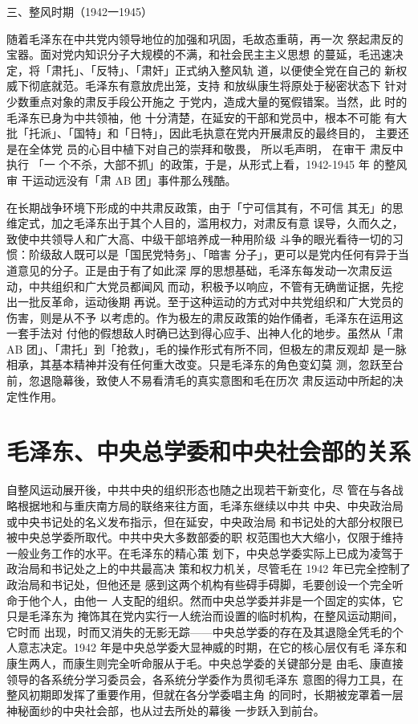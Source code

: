 三、整风时期（1942一1945）

随着毛泽东在中共党内领导地位的加强和巩固，毛故态重萌，再一次 祭起肃反的
宝器。面对党内知识分子大规模的不满，和社会民主主义思想 的蔓延，毛迅速决
定，将「肃托」、「反特」、「肃奸」正式纳入整风轨 道，以便使全党在自己的
新权威下彻底就范。毛泽东有意放虎出笼，支持 和放纵康生将原处于秘密状态下
针对少数重点对象的肃反手段公开施之 于党内，造成大量的冤假错案。当然，此
时的毛泽东已身为中共领袖，他 十分清楚，在延安的干部和党员中，根本不可能
有大批「托派」、「国特」和「日特」，因此毛执意在党内开展肃反的最终目的，
主要还是在全体党 员的心目中植下对自己的崇拜和敬畏， 所以毛声明， 在审干
肃反中执行 「一 个不杀，大部不抓」的政策，于是，从形式上看，1942-1945 年
的整风审 干运动远没有「肃 AB 团」事件那么残酷。

在长期战争环境下形成的中共肃反政策，由于「宁可信其有，不可信
其无」的思维定式，加之毛泽东出于其个人目的，滥用权力，对肃反有意
误导，久而久之，致使中共领导人和广大高、中级干部培养成一种用阶级
斗争的眼光看待一切的习惯：阶级敌人既可以是「国民党特务」、「暗害
分子」，更可以是党内任何有异于当道意见的分子。正是由于有了如此深
厚的思想基础，毛泽东每发动一次肃反运动，中共组织和广大党员都闻风
而动，积极予以响应，不管有无确凿证据，先挖出一批反革命，运动後期
再说。至于这种运动的方式对中共党组织和广大党员的伤害，则是从不予
以考虑的。作为极左的肃反政策的始作俑者，毛泽东在运用这一套手法对
付他的假想敌人时确已达到得心应手、出神人化的地步。虽然从「肃 AB
团」、「肃托」到「抢救」，毛的操作形式有所不同，但极左的肃反观却
是一脉相承，其基本精神并没有任何重大改变。只是毛泽东的角色变幻莫
测，忽跃至台前，忽退隐幕後，致使人不易看清毛的真实意图和毛在历次
肃反运动中所起的决定性作用。

\section{毛泽东、中央总学委和中央社会部的关系}
自整风运动展开後，中共中央的组织形态也随之出现若干新变化，尽
管在与各战略根据地和与重庆南方局的联络来往方面，毛泽东继续以中共
中央、中央政治局或中央书记处的名义发布指示，但在延安，中央政治局
和书记处的大部分权限已被中央总学委所取代。中共中央大多数部委的职
权范围也大大缩小，仅限于维持一般业务工作的水平。在毛泽东的精心策
划下，中央总学委实际上已成为凌驾于政治局和书记处之上的中共最高决
策和权力机关，尽管毛在 1942 年已完全控制了政治局和书记处，但他还是
感到这两个机构有些碍手碍脚，毛要创设一个完全听命于他个人，由他一
人支配的组织。然而中央总学委并非是一个固定的实体，它只是毛泽东为
掩饰其在党内实行一人统治而设置的临时机构，在整风运动期间，它时而
出现，时而又消失的无影无踪——中央总学委的存在及其退隐全凭毛的个
人意志决定。1942 年是中央总学委大显神威的时期，在它的核心层仅有毛
泽东和康生两人，而康生则完全听命服从于毛。中央总学委的关键部分是
由毛、康直接领导的各系统分学习委员会，各系统分学委作为贯彻毛泽东
意图的得力工具，在整风初期即发挥了重要作用，但就在各分学委唱主角
的同时，长期被宠罩着一层神秘面纱的中央社会部，也从过去所处的幕後
一步跃入到前台。

